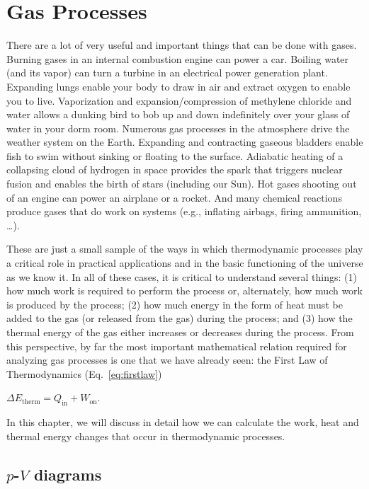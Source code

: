 \chapter{Gas Processes}
\label{chapter:gas_processes}

There are a lot of very useful and important things that can be done
with gases. Burning gases in an internal combustion engine can power a
car.  Boiling water (and its vapor) can turn a turbine in an
electrical power generation plant. Expanding lungs enable your body to
draw in air and extract oxygen to enable you to live.  Vaporization
and expansion/compression of methylene chloride and water allows a
dunking bird to bob up and down indefinitely over your glass of water
in your dorm room.  Numerous gas processes in the atmosphere drive the
weather system on the Earth.  Expanding and contracting gaseous
bladders enable fish to swim without sinking or floating to the
surface.  Adiabatic heating of a collapsing cloud of hydrogen in space
provides the spark that triggers nuclear fusion and enables the birth
of stars (including our Sun). Hot gases shooting out of an engine can
power an airplane or a rocket.  And many chemical reactions produce
gases that do work on systems (e.g., inflating airbags, firing
ammunition, \dots).

These are just a small sample of the ways in which thermodynamic
processes play a critical role in practical applications and in the
basic functioning of the universe as we know it.  In all of these
cases, it is critical to understand several things: (1) how much work
is required to perform the process or, alternately, how much work is
produced by the process; (2) how much energy in the form of heat must
be added to the gas (or released from the gas) during the process; and
(3) how the thermal energy of the gas either increases or decreases
during the process.  From this perspective, by far the most important
mathematical relation required for analyzing gas processes is one that
we have already seen: the First Law of Thermodynamics
(Eq.~\ref{eq:firstlaw})

\begin{center}
$\Delta E_\text{therm} = Q_\text{in} + W_\text{on}$. 
\end{center}

In this chapter, we will discuss in detail how we can calculate the work, heat and thermal energy changes that occur in thermodynamic processes.

\section{$p$-$V$ diagrams}

